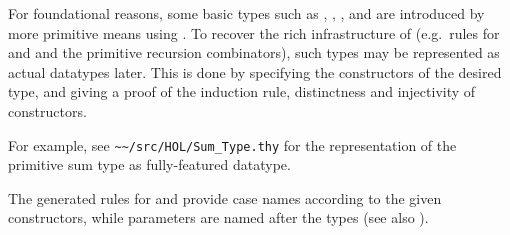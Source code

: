\begin{isabellebody}
\begin{isamarkuptext}
\begin{description}
  For foundational reasons, some basic types such as , , ,  and  are
  introduced by more primitive means using \hyperlink{command.typedef}{\mbox{}}.  To
  recover the rich infrastructure of \hyperlink{command.datatype}{\mbox{}} (e.g.\ rules
  for \hyperlink{method.cases}{\mbox{}} and \hyperlink{method.induct}{\mbox{}} and the primitive recursion
  combinators), such types may be represented as actual datatypes
  later.  This is done by specifying the constructors of the desired
  type, and giving a proof of the induction rule, distinctness and
  injectivity of constructors.

  For example, see \verb|~~/src/HOL/Sum_Type.thy| for the
  representation of the primitive sum type as fully-featured datatype.

  \end{description}

  The generated rules for \hyperlink{method.induct}{\mbox{}} and \hyperlink{method.cases}{\mbox{}} provide
  case names according to the given constructors, while parameters are
  named after the types (see also ).


\end{isamarkuptext}
\end{isabellebody}
